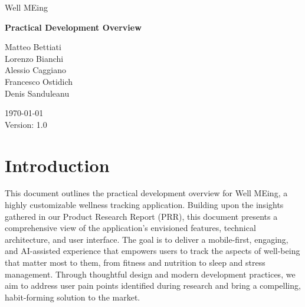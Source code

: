 \documentclass{article}
\begin{document}


\begin{center}

    \fontsize{20pt}{30pt}\selectfont
    Well MEing

    \vspace{2cm}

    \fontsize{25pt}{45pt}\selectfont
    \textbf{Practical Development Overview}

    \vfill

    \fontsize{12pt}{18pt}\selectfont
    Matteo Bettiati \\
    Lorenzo Bianchi \\
    Alessio Caggiano \\
    Francesco Ostidich \\
    Denis Sanduleanu \\

    \vspace{1cm}

    \today \\
    \vspace{12pt}
    Version: 1.0
    \normalsize

\end{center}

\newpage
{}
\tableofcontents
\newpage



\section{Introduction}

This document outlines the practical development overview for Well MEing, a highly customizable wellness tracking application.
Building upon the insights gathered in our Product Research Report (PRR), this document presents a comprehensive view of the application's envisioned features, technical architecture, and user interface.
The goal is to deliver a mobile-first, engaging, and AI-assisted experience that empowers users to track the aspects of well-being that matter most to them, from fitness and nutrition to sleep and stress management.
Through thoughtful design and modern development practices, we aim to address user pain points identified during research and bring a compelling, habit-forming solution to the market.
\end{document}
